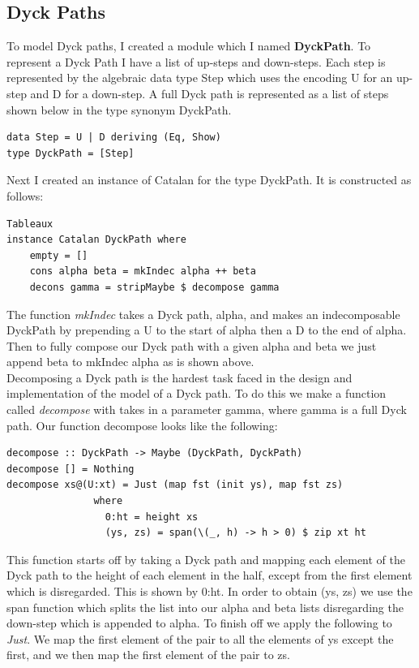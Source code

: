\documentclass[12pt]{article}
\begin{document}
\subsection{Dyck Paths}
To model Dyck paths, I created a module which I named {\bf DyckPath}. To represent a Dyck Path I have a list of up-steps and down-steps. Each step is represented by the algebraic data type Step which uses the encoding U for an up-step and D for a down-step. A full Dyck path is represented as a list of steps shown below in the type synonym DyckPath.
\begin{lstlisting}
data Step = U | D deriving (Eq, Show)
type DyckPath = [Step]
\end{lstlisting}
Next I created an instance of Catalan for the type DyckPath. It is constructed as follows:
\begin{lstlisting}Tableaux
instance Catalan DyckPath where
	empty = []
	cons alpha beta = mkIndec alpha ++ beta 
	decons gamma = stripMaybe $ decompose gamma
\end{lstlisting}
The function {\it mkIndec} takes a Dyck path, alpha, and makes an indecomposable DyckPath by prepending a U to the start of alpha then a D to the end of alpha. Then to fully compose our Dyck path with a given alpha and beta we just append beta to mkIndec alpha as is shown above.\\
Decomposing a Dyck path is the hardest task faced in the design and implementation of the model of a Dyck path. To do this we make a function called {\it decompose} with takes in a parameter gamma, where gamma is a full Dyck path. Our function decompose looks like the following:
\begin{lstlisting}
decompose :: DyckPath -> Maybe (DyckPath, DyckPath)
decompose [] = Nothing
decompose xs@(U:xt) = Just (map fst (init ys), map fst zs) 
               where
                 0:ht = height xs 
                 (ys, zs) = span(\(_, h) -> h > 0) $ zip xt ht
\end{lstlisting}
This function starts off by taking a Dyck path and mapping each element of the Dyck path to the height of each element in the half, except from the first element which is disregarded. This is shown by 0:ht. In order to obtain (ys, zs) we use the span function which splits the list into our alpha and beta lists disregarding the down-step which is appended to alpha. To finish off we apply the following to {\it Just}. We map the first element of the pair to all the elements of ys except the first, and we then map the first element of the pair to zs.\\
\end{document}
